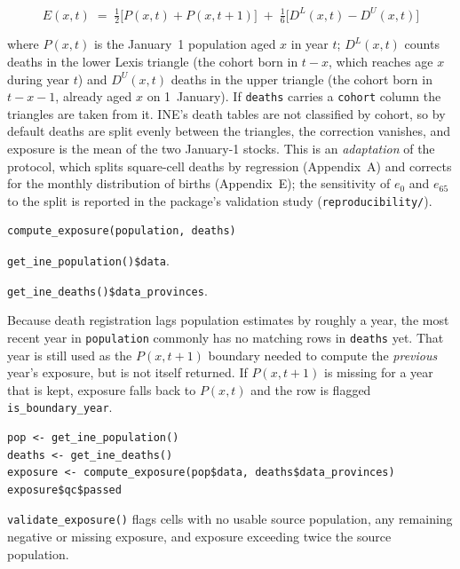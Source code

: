 \documentclass[11pt]{article}
\newcommand{\fn}[1]{\texttt{#1}}
\begin{document}
\begin{equation}
E(x,t) \;=\; \tfrac{1}{2}\bigl[P(x,t) + P(x,t+1)\bigr]
\;+\; \tfrac{1}{6}\bigl[D^{L}(x,t) - D^{U}(x,t)\bigr]
\end{equation}

where $P(x,t)$ is the January~1 population aged $x$ in year $t$;
$D^{L}(x,t)$ counts deaths in the lower Lexis triangle (the cohort born in
$t-x$, which reaches age $x$ during year $t$) and $D^{U}(x,t)$ deaths in the
upper triangle (the cohort born in $t-x-1$, already aged $x$ on 1~January).
If \fn{deaths} carries a \fn{cohort} column the triangles are taken from it.
INE's death tables are not classified by cohort, so by default deaths are
split evenly between the triangles, the correction vanishes, and exposure is
the mean of the two January-1 stocks. This is an \emph{adaptation} of the
protocol, which splits square-cell deaths by regression (Appendix~A) and
corrects for the monthly distribution of births (Appendix~E); the
sensitivity of $e_0$ and $e_{65}$ to the split is reported in the package's
validation study (\texttt{reproducibility/}).

\begin{lstlisting}
compute_exposure(population, deaths)
\end{lstlisting}

\begin{description}[leftmargin=2.2cm,style=nextline]
  \item[population] \fn{get\_ine\_population()\$data}.
  \item[deaths] \fn{get\_ine\_deaths()\$data\_provinces}.
\end{description}

Because death registration lags population estimates by roughly a year, the
most recent year in \fn{population} commonly has no matching rows in
\fn{deaths} yet. That year is still used as the $P(x,t+1)$ boundary needed
to compute the \emph{previous} year's exposure, but is not itself returned.
If $P(x,t+1)$ is missing for a year that is kept, exposure falls back to
$P(x,t)$ and the row is flagged \fn{is\_boundary\_year}.

\begin{lstlisting}
pop <- get_ine_population()
deaths <- get_ine_deaths()
exposure <- compute_exposure(pop$data, deaths$data_provinces)
exposure$qc$passed
\end{lstlisting}

\fn{validate\_exposure()} flags cells with no usable source population,
any remaining negative or missing exposure, and exposure exceeding twice the
source population.
\end{document}
